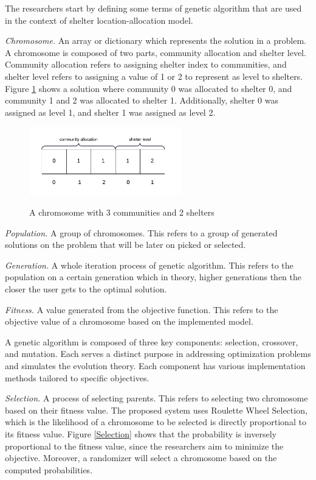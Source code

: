 	The researchers start by defining some terms of genetic algorithm that are used in the context of shelter location-allocation model.
	
	\textit{Chromosome.}  An array or dictionary which represents the  solution in a problem. A chromosome is composed of two parts, community allocation and shelter level. Community allocation refers to assigning shelter index to communities, and shelter level refers to assigning a value of 1 or 2 to represent as level to shelters. Figure \ref{Chromosome} shows a solution where community 0 was allocated to shelter 0, and community 1 and 2 was allocated to shelter 1. Additionally, shelter 0 was assigned as level 1, and shelter 1 was assigned as level 2.
	
	\begin{figure}[h!]
		\caption{A chromosome with 3 communities and 2 shelters}
		\centering
		\includegraphics[width=250px]{Chromosome}
		\label{Chromosome}
	\end{figure}
	
	\textit{Population.} A group of chromosomes. This refers to a group of generated solutions on the problem that will be later on picked or selected.
	
	\textit{Generation.} A whole iteration process of genetic algorithm. This refers to the population on a certain generation which in theory, higher generations then the closer the user gets to the optimal solution.
	
	\textit{Fitness.} A value generated from the objective function. This refers to the objective value of a chromosome based on the implemented model.
	
	A genetic algorithm is composed of three key components: selection, crossover, and mutation. Each serves a distinct purpose in addressing optimization problems and simulates the evolution theory. Each component has various implementation methods tailored to specific objectives. \parencite{Eyal2020}
	
	\textit{Selection.} A process of selecting parents. This refers to selecting two chromosome based on their fitness value. The proposed system uses Roulette Wheel Selection, which is the likelihood of a chromosome to be selected is directly proportional to its fitness value. Figure \ref{Selection} shows that the probability is inversely proportional to the fitness value, since the researchers aim to minimize the objective. Moreover, a randomizer will select a chromosome based on the computed probabilities.
	
